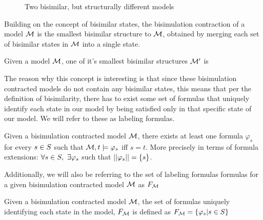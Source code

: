 \begin{figure}[h]
	\label{fig:bisimmods}
	\caption{Two bisimilar, but structurally different models}
	\centering
\end{figure}

Building on the concept of bisimilar states, the bisimulation contraction of a model $\mathcal{M}$ is the smallest bisimilar structure to $\mathcal{M}$, obtained by merging each set of bisimilar states in $\mathcal{M}$ into a single state. 

\begin{definition}
	\label{def:bisimContract}
	Given a model $\mathcal{M}$, one of it's smallest bisimilar structures $\mathcal{M}'$ is 
\end{definition}

The reason why this concept is interesting is that since these bisimulation contracted models do not contain any bisimilar states, this means that per the definition of bisimilarity, there has to exist some set of formulas that uniquely identify each state in our model by being satisfied only in that specific state of our model. We will refer to these as labeling formulas.

\begin{definition}
	\label{def:label}
	Given a bisimulation contracted model $\mathcal{M}$, there exists at least one formula $\varphi_s$ for every $s\in S$ such that $\mathcal{M},t \models \varphi_s$ iff $s = t$. More precisely in terms of formula extensions: 
	\centering
	$\forall s\in S,~\exists\varphi_s$ such that $||\varphi_s|| = \{s\}$.
\end{definition}

Additionally, we will also be referring to the set of labeling formulas formulas for a given bisimulation contracted model $\mathcal{M}$ as $F_{\mathcal{M}}$

\begin{definition}
	\label{def:labelSet}
	Given a bisimulation contracted model $\mathcal{M}$, the set of formulas uniquely identifying each state in the model, $F_{\mathcal{M}}$ is defined as $F_{\mathcal{M}} = \{\varphi_s | s \in S\}$
\end{definition}

